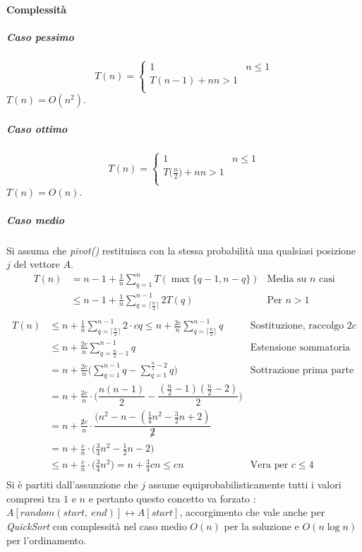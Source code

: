 \paragraph{Complessit\`a}
\subparagraph{Caso pessimo}
$$T(n) = 
\begin{cases}
	1 & n\le 1\\
	T(n - 1) + n n > 1\\
\end{cases}
$$
$T(n) = O(n^2)$.
\subparagraph{Caso ottimo}
$$T(n) = 
\begin{cases}
	1 & n\le 1\\
	T\bigl(\frac{n}{2}\bigr) + n n > 1\\
\end{cases}
$$
$T(n) = O(n)$.
\subparagraph{Caso medio}\mbox{}
Si assuma che \emph{pivot()} restituisca con la stessa probabilit\`a una qualsiasi posizione $j$ del vettore $A$.
\begin{align*}
	T(n) &= n - 1 + \frac{1}{n}\sum\limits_{q = 1}^n T(\max\{q - 1, n - q\}) & \text{Media su } n \text{ casi}\\
	     &\le n - 1 + \frac{1}{n}\sum\limits_{q = \lceil\frac{n}{2}\rceil}^{n-1}2T(q) & \text{Per } n > 1\\
\end{align*}
\begin{align*}
	T(n) &\le n + \frac{1}{n}\sum\limits_{q = \lceil\frac{n}{2}\rceil}^{n-1}2\cdot cq\le n + \frac{2c}{n}\sum\limits_{q = \lceil\frac{n}{2}\rceil}^{n-1}q &\text{Sostituzione, raccolgo } 2c\\
	     &\le n + \frac{2c}{n}\sum\limits_{q = \frac{n}{2}-1}^{n-1}q &\text{Estensione sommatoria}\\
	     &= n + \frac{2c}{n}\biggl(\sum\limits_{q = 1}^{n-1} q - \sum\limits_{q = 1}^{\frac{n}{2}-2} q\biggr) &\text{Sottrazione prima parte}\\
	     &= n + \frac{2c}{n}\cdot\biggl(\dfrac{n(n-1)}{2}-\dfrac{(\frac{n}{2} - 1)(\frac{n}{2} - 2)}{2}\biggr)\\
	     &= n + \frac{\not2c}{n}\cdot\dfrac{(n^2 - n - (\frac{1}{4}n^2-\frac{3}{2}n + 2)}{\not2}\\
	     &= n + \frac{c}{n}\cdot\biggl(\frac{3}{4}n^2-\frac{1}{2}n-2\biggr)\\
	     &\le n + \frac{c}{n}\cdot\biggl(\frac{3}{4}n^2\biggr) = n + \frac{3}{4}cn \le cn &\text{Vera per }c\le 4\\
\end{align*}
Si \`e partiti dall'assunzione che $j$ assume equiprobabilisticamente tutti i valori compresi tra $1$ e $n$ e pertanto questo concetto va forzato : $A[random(start,\ end)]\leftrightarrow
A[start]$, accorgimento che vale anche per \emph{QuickSort} con complessit\`a nel caso medio $O(n)$ per la soluzione e $O(n\log n)$ per l'ordinamento. 
